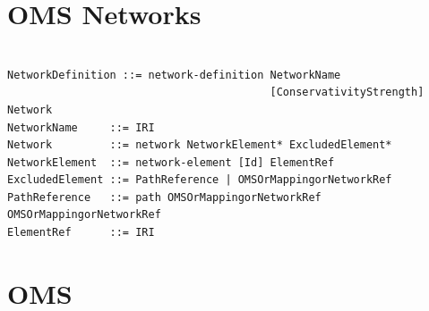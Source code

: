 \documentclass[10pt,fleqn,final]{scrreprt}
\makeatletter
\newcommand*{\eg}{e.g.\@\xspace}
\newcommand*\CommentAuthor{}
\renewcommand*\CommentAuthor{#1}}
\newcommand*\CommentDate{}
\renewcommand*\CommentDate{#1}}
\newcommand*\CommentId{}
\renewcommand*\CommentId{#1}}
\newcommand*\CommentType{}
\renewcommand*\CommentType{#1}}
\newcommand*{\SetCommentColorByType}[1]{%
\edef\localType{{#1}}%
\expandafter\ifstrequal\localType{q-aut}{\colorlet{CommentColor}{red}}{%
\expandafter\ifstrequal\localType{q-all}{\colorlet{CommentColor}{orange}}{%
\expandafter\ifstrequal\localType{todo}{\colorlet{CommentColor}{orange}}{%
\expandafter\ifstrequal\localType{fyi}{\colorlet{CommentColor}{lightgray}}{%
\colorlet{CommentColor}{yellow}}}}}}
\newcommand*{\SetCommentPrefixByType}[1]{%
\edef\localType{{#1}}%
\expandafter\@ifmtarg\localType{%
\edef\CommentPrefix{}%
}{%
\caseupper[q]{#1}%
\edef\CommentPrefix{\thestring: }%
}}
\newcommand*{\initComment}[1]{%
\setkeys{Comment}{#1}%
\SetCommentColorByType{\CommentType}%
\relax%
\SetCommentPrefixByType{\CommentType}%
\relax%
}
\newcommand*{\todonote}[2][]{%
\initComment{#1}%
\pdfcomment[author=\CommentAuthor,color=CommentColor,date=\CommentDate,id=\CommentId]{%
\CommentPrefix
#2}}
\renewcommand*{\todonote}[2][]{%
\initComment{#1}%
\ednote{\CommentPrefix #2}}
\renewcommand*{\textLF}{\\}
\newcommand{\sclause}[1]{\section{#1}}
\newenvironment{definitions}[0]{\medskip }{}
\makeatother
\begin{document}
\begin{definitions}


\sclause{OMS Networks}\label{a:networks}
\begin{lstlisting}[language=ebnf,escapeinside={()}]  % abstract syntax

NetworkDefinition ::= network-definition NetworkName
                                         [ConservativityStrength] Network
NetworkName     ::= IRI
Network         ::= network NetworkElement* ExcludedElement*
NetworkElement  ::= network-element [Id] ElementRef
ExcludedElement ::= PathReference | OMSOrMappingorNetworkRef
PathReference   ::= path OMSOrMappingorNetworkRef OMSOrMappingorNetworkRef
ElementRef      ::= IRI
\end{lstlisting}



\sclause{OMS}

\begin{lstlisting}[language=ebnf,escapeinside={()}]  % abstract syntax


\end{lstlisting}
\end{definitions}
\end{document}
